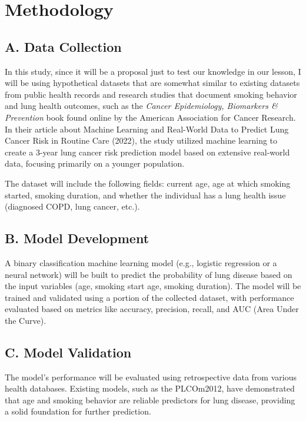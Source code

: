 \documentclass[12pt]{article}
\begin{document}
\section*{Methodology}

\subsection*{A. Data Collection}

In this study, since it will be a proposal just to test our knowledge in our lesson, I will be using hypothetical datasets that are somewhat similar to existing datasets from public health records and research studies that document smoking behavior and lung health outcomes, such as the \textit{Cancer Epidemiology, Biomarkers \& Prevention} book found online by the American Association for Cancer Research. In their article about Machine Learning and Real-World Data to Predict Lung Cancer Risk in Routine Care (2022), the study utilized machine learning to create a 3-year lung cancer risk prediction model based on extensive real-world data, focusing primarily on a younger population.

The dataset will include the following fields: current age, age at which smoking started, smoking duration, and whether the individual has a lung health issue (diagnosed COPD, lung cancer, etc.).

\subsection*{B. Model Development}

A binary classification machine learning model (e.g., logistic regression or a neural network) will be built to predict the probability of lung disease based on the input variables (age, smoking start age, smoking duration). The model will be trained and validated using a portion of the collected dataset, with performance evaluated based on metrics like accuracy, precision, recall, and AUC (Area Under the Curve).

\subsection*{C. Model Validation}

The model’s performance will be evaluated using retrospective data from various health databases. Existing models, such as the PLCOm2012, have demonstrated that age and smoking behavior are reliable predictors for lung disease, providing a solid foundation for further prediction.
\end{document}

